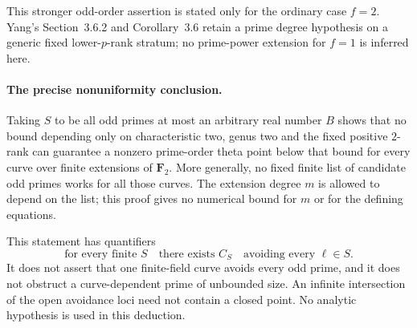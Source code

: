 This stronger odd-order assertion is stated only for the ordinary
case $f=2$.  Yang's Section~3.6.2 and Corollary~3.6 retain a prime
degree hypothesis on a generic fixed lower-$p$-rank stratum; no
prime-power extension for $f=1$ is inferred here.

\paragraph{The precise nonuniformity conclusion.}
Taking $S$ to be all odd primes at most an arbitrary real number $B$
shows that no bound depending only on characteristic two, genus two
and the fixed positive $2$-rank can guarantee a nonzero prime-order
theta point below that bound for every curve over finite extensions
of $\mathbf F_2$.  More generally, no fixed finite list of candidate
odd primes works for all those curves.  The extension degree $m$ is
allowed to depend on the list; this proof gives no numerical bound
for $m$ or for the defining equations.

This statement has quantifiers
\[
 \text{for every finite }S\quad\text{there exists }C_S
 \quad\text{avoiding every }\ell\in S.
\]
It does not assert that one finite-field curve avoids every odd prime,
and it does not obstruct a curve-dependent prime of unbounded size.
An infinite intersection of the open avoidance loci need not contain
a closed point.  No analytic hypothesis is used in this deduction.
